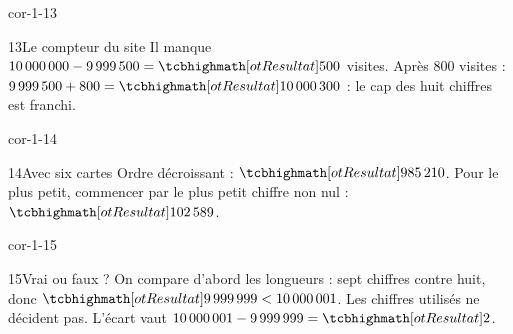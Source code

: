 \begin{blocLivre}{cor-1-13}\begin{corrige}{13}{Le compteur du site}
Il manque $10\,000\,000-9\,999\,500=\res{500}$ visites. Après 800 visites : $9\,999\,500+800=\res{10\,000\,300}$ : le cap des huit chiffres est franchi.
\end{corrige}\end{blocLivre}
\begin{blocLivre}{cor-1-14}\begin{corrige}{14}{Avec six cartes}
Ordre décroissant : $\res{985\,210}$. Pour le plus petit, commencer par le plus petit chiffre non nul : $\res{102\,589}$.
\end{corrige}\end{blocLivre}
\begin{blocLivre}{cor-1-15}\begin{corrige}{15}{Vrai ou faux ?}
On compare d’abord les longueurs : sept chiffres contre huit, donc $\res{9\,999\,999<10\,000\,001}$. Les chiffres utilisés ne décident pas. L’écart vaut $10\,000\,001-9\,999\,999=\res2$.
\end{corrige}\end{blocLivre}
